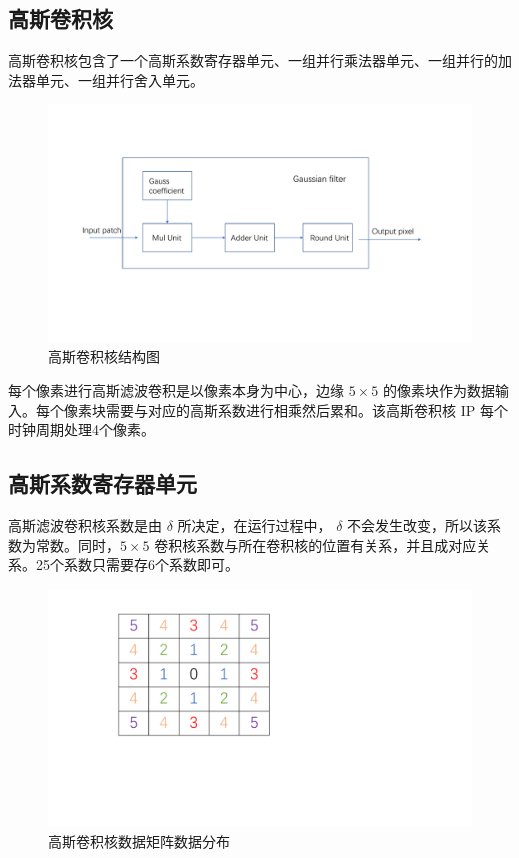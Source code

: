 \documentclass[12pt, a4paper, oneside]{ctexbook}
\begin{document}
	\subsection{高斯卷积核}
	高斯卷积核包含了一个高斯系数寄存器单元、一组并行乘法器单元、一组并行的加法器单元、一组并行舍入单元。
		\begin{figure}[h]
			\centering
			\includegraphics[scale=0.55]{pic/gaussian_filter}
			\caption{高斯卷积核结构图}
			\label{fig:gaussianfilter}
		\end{figure}
	每个像素进行高斯滤波卷积是以像素本身为中心，边缘 $5\times5$ 的像素块作为数据输入。每个像素块需要与对应的高斯系数进行相乘然后累和。该高斯卷积核 IP 每个时钟周期处理4个像素。
	\subsection{高斯系数寄存器单元}
	高斯滤波卷积核系数是由 $\delta$ 所决定，在运行过程中， $\delta$ 不会发生改变，所以该系数为常数。同时，$5\times5$ 卷积核系数与所在卷积核的位置有关系，并且成对应关系。25个系数只需要存6个系数即可。
	\begin{figure}[h]
		\centering
		\includegraphics[scale=0.4]{pic/number}
		\caption{高斯卷积核数据矩阵数据分布}
		\label{fig:number}
	\end{figure}
\end{document}
